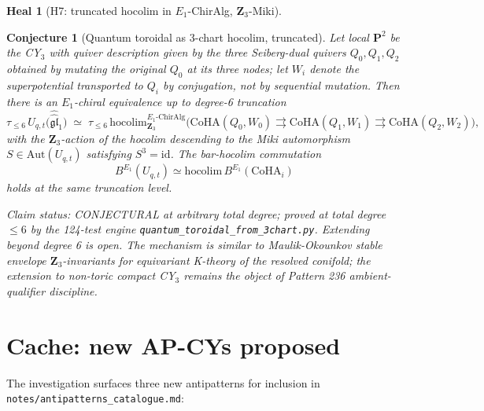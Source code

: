 \documentclass[11pt]{amsart}
\newtheorem{conjecture}[theorem]{Conjecture}
\theoremstyle{definition}
\newtheorem{heal}[attack]{Heal}
\providecommand{\Eone}{E_1}
\providecommand{\fgl}{\mathfrak{gl}}
\providecommand{\bP}{\mathbf{P}}
\providecommand{\bZ}{\mathbf{Z}}
\providecommand{\CoHA}{\mathrm{CoHA}}
\begin{document}
\begin{heal}[H7: truncated hocolim in $\Eone$-ChirAlg, $\bZ_3$-Miki]\leavevmode

\begin{conjecture}[Quantum toroidal as 3-chart hocolim, truncated]\label{conj:qt-hocolim}
Let local $\bP^2$ be the CY$_3$ with quiver description given by the
three Seiberg-dual quivers $Q_0, Q_1, Q_2$ obtained by mutating the
original $Q_0$ at its three nodes; let $W_i$ denote the superpotential
transported to $Q_i$ by conjugation, not by sequential mutation. Then
there is an $\Eone$-chiral equivalence up to degree-6 truncation
\[
 \tau_{\leq 6}\,U_{q,t}\bigl(\widehat{\widehat{\fgl}}_1\bigr)
 \;\simeq\;
 \tau_{\leq 6}\,\mathrm{hocolim}^{\Eone\text{-ChirAlg}}_{\bZ_3}
 \bigl(\CoHA(Q_0,W_0)
 \rightrightarrows \CoHA(Q_1,W_1)
 \rightrightarrows \CoHA(Q_2,W_2)\bigr),
\]
with the $\bZ_3$-action of the hocolim descending to the Miki
automorphism $S \in \mathrm{Aut}(U_{q,t})$ satisfying $S^3 = \mathrm{id}$.
The bar-hocolim commutation
\[
 B^{\Eone}(U_{q,t}) \simeq \mathrm{hocolim}\, B^{\Eone}(\CoHA_i)
\]
holds at the same truncation level.

\emph{Claim status: CONJECTURAL at arbitrary total degree}; proved at
total degree $\leq 6$ by the 124-test engine
\texttt{quantum\_toroidal\_from\_3chart.py}. Extending beyond degree
6 is open. The mechanism is similar to Maulik-Okounkov stable envelope
$\bZ_3$-invariants for equivariant K-theory of the resolved conifold;
the extension to non-toric compact CY$_3$ remains the object of
Pattern 236 ambient-qualifier discipline.
\end{conjecture}
\end{heal}

\section*{Cache: new AP-CYs proposed}

The investigation surfaces three new antipatterns for inclusion in
\texttt{notes/antipatterns\_catalogue.md}:
\end{document}
